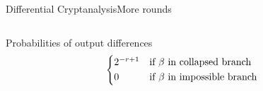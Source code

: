 \begin{frame}{Differential Cryptanalysis}{More rounds}
\begin{columns}
\begin{column}{0.49\textwidth}
{\begin{block}{Probabilities of output differences}
\begin{equation*}
\begin{cases*}
                        2^{-r+1} & if $\beta$ in collapsed branch\\
                        0        & if $\beta$ in impossible branch
                    \end{cases*}
                \end{equation*}
            \end{block}
            }
        \end{column}
    \end{columns}
\end{frame}

